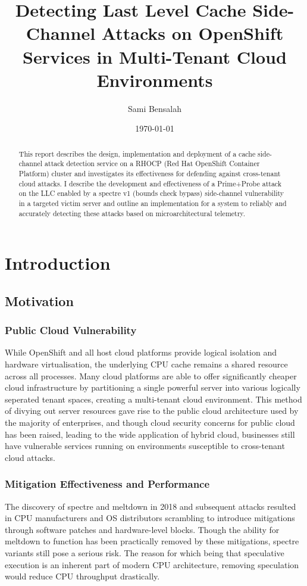\documentclass[11pt,a4paper, notitlepage]{article}
\title{Detecting Last Level Cache Side-Channel Attacks on OpenShift Services in Multi-Tenant Cloud Environments}
\author{Sami Bensalah}
\date{\today}
\begin{document}
\maketitle
\begin{abstract}
\footnotesize
This report describes the design, implementation and deployment of a cache side-channel attack detection service on a RHOCP (Red Hat OpenShift Container Platform) cluster and investigates its effectiveness for defending against cross-tenant cloud attacks. I describe the development and effectiveness of a Prime+Probe attack on the LLC enabled by a spectre v1 (bounds check bypass) side-channel vulnerability in a targeted victim server and outline an implementation for a system to reliably and accurately detecting these attacks based on microarchitectural telemetry.
\end{abstract}



\section{Introduction}
\subsection{Motivation}
\subsubsection{Public Cloud Vulnerability}
While OpenShift and all host cloud platforms provide logical isolation and hardware virtualisation, the underlying CPU cache remains a shared resource across all processes. Many cloud platforms are able to offer significantly cheaper cloud infrastructure by partitioning a single powerful server into various logically seperated tenant spaces, creating a multi-tenant cloud environment. This method of divying out server resources gave rise to the public cloud architecture used by the majority of enterprises, and though cloud security concerns for public cloud has been raised, leading to the wide application of hybrid cloud, businesses still have vulnerable services running on environments susceptible to cross-tenant cloud attacks.
\subsubsection{Mitigation Effectiveness and Performance}
The discovery of spectre and meltdown in 2018 and subsequent attacks resulted in CPU manufacturers and OS distributors scrambling to introduce mitigations through software patches and hardware-level blocks. Though the ability for meltdown to function has been practically removed by these mitigations, spectre variants still pose a serious risk. The reason for which being that speculative execution is an inherent part of modern CPU architecture, removing speculation would reduce CPU throughput drastically. 
\end{document}
